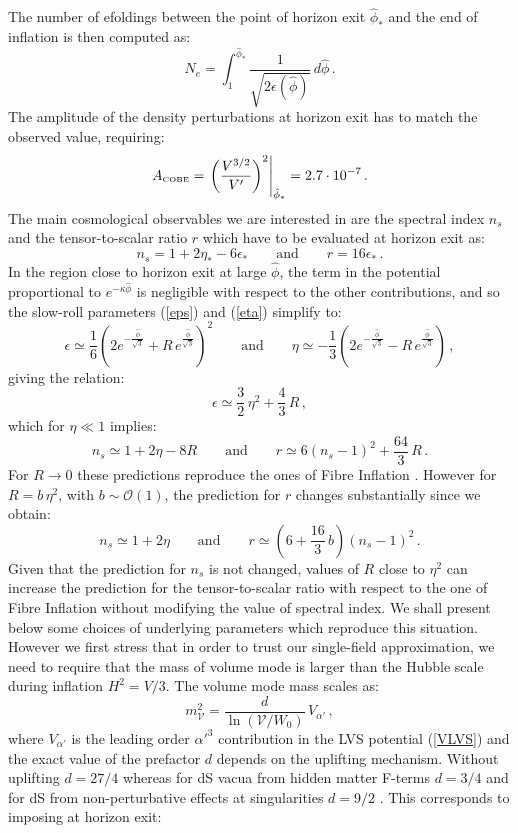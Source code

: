\documentclass[11pt,a4paper]{article}
\newcommand{\be}{\begin{equation}}
\newcommand{\ee}{\end{equation}}
\newcommand\vo{{\mathcal{V}}}
\newcommand{\mc}{\mathcal}
\begin{document}
The number of efoldings between the point of horizon exit $\hat\phi_*$ and the end of inflation is then computed as:
\be
N_e = \int_{1}^{\hat\phi_*} \frac{1}{\sqrt{2\epsilon(\hat\phi)}}\,d\hat\phi\,.
\ee
The amplitude of the density perturbations at horizon exit has to match the observed value, requiring:
\be
A_{\scriptscriptstyle \rm COBE} = \left.\left(\frac{V^{3/2}}{V'}\right)^2\right|_{\hat\phi_*} = 2.7\cdot 10^{-7}\,.
\ee
The main cosmological observables we are interested in are the spectral index $n_s$ and the tensor-to-scalar ratio $r$ which have to be evaluated at horizon exit as:
\be
n_s = 1 +2\eta_* -6\epsilon_*\qquad\text{and}\qquad r=16\epsilon_*\,.
\ee
In the region close to horizon exit at large $\hat\phi$, the term in the potential proportional to $e^{-\kappa\hat\phi}$ is negligible with respect to the other contributions, and so the slow-roll parameters (\ref{eps}) and (\ref{eta}) simplify to:
\be
\epsilon \simeq\frac16 \left(2 e^{-\frac{\hat\phi}{\sqrt{3}}}+R\,e^{\frac{\hat\phi}{\sqrt{3}}}\right)^2
\qquad\text{and}\qquad
\eta\simeq -\frac13 \left(2 e^{-\frac{\hat\phi}{\sqrt{3}}}-R\,e^{\frac{\hat\phi}{\sqrt{3}}}\right)\,,
\label{epseta}
\ee
giving the relation:
\be
\epsilon\simeq \frac32\,\eta^2+\frac43\,R\,,
\ee
which for $\eta\ll 1$ implies:
\be
n_s\simeq 1+2\eta - 8R\qquad\text{and}\qquad  r\simeq 6\left(n_s-1\right)^2 + \frac{64}{3}\,R\,.
\ee
For $R\to 0$ these predictions reproduce the ones of Fibre Inflation \cite{Cicoli:2008gp}. However for $R = b \,\eta^2$, with $b\sim \mc{O}(1)$, the prediction for $r$ changes substantially since we obtain:
\be
n_s\simeq 1+2\eta \qquad\text{and}\qquad  r\simeq \left(6+\frac{16}{3}\,b\right)\left(n_s-1\right)^2\,.
\ee
Given that the prediction for $n_s$ is not changed, values of $R$ close to $\eta^2$ can increase the prediction for the tensor-to-scalar ratio with respect to the one of Fibre Inflation without modifying the value of spectral index. We shall present below some choices of underlying parameters which reproduce this situation. However we first stress that in order to trust our single-field approximation, we need to require that the mass of volume mode is larger than the Hubble scale during inflation $H^2=V/3$. The volume mode mass scales as:
\be
m_\vo^2 = \frac{d}{\ln\left(\vo/W_0\right)}\,V_{\alpha'}\,,
\ee
where $V_{\alpha'}$ is the leading order $\alpha'^3$ contribution in the LVS potential (\ref{VLVS}) and the exact value of the prefactor $d$ depends on the uplifting mechanism. Without uplifting $d=27/4$ \cite{Conlon:2007gk} whereas for dS vacua from hidden matter F-terms $d=3/4$ and for dS from non-perturbative effects at singularities $d=9/2$ \cite{Cicoli:2015bpq}. This corresponds to imposing at horizon exit:
\end{document}
